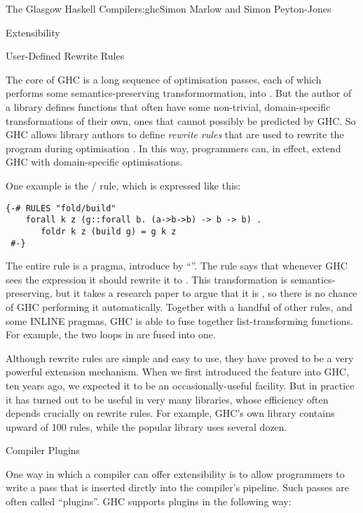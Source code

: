\begin{aosachapter}{The Glasgow Haskell Compiler}{s:ghc}{Simon Marlow and Simon Peyton-Jones}
\begin{aosasect1}{Extensibility}
\begin{aosasect2}{User-Defined Rewrite Rules}
\label{s:rules}

The core of GHC is a long sequence of optimisation passes, each of
which performs some semantics-preserving transformormation,
 into .  But the author of a library defines
functions that often have some non-trivial, domain-specific
transformations of their own, ones that cannot possibly be predicted
by GHC. So GHC allows library authors to define \emph{rewrite rules}
that are used to rewrite the program during optimisation
\cite{bib:playing-by-the-rules}.  In this way, programmers can,
in effect, extend GHC with domain-specific optimisations.

One example is the / rule, which is expressed like this:

\begin{verbatim}
{-# RULES "fold/build"    
    forall k z (g::forall b. (a->b->b) -> b -> b) . 
       foldr k z (build g) = g k z
 #-}
\end{verbatim}

The entire rule is a pragma, introduce by ``''.  The
rule says that whenever GHC sees the expression  it should rewrite it to .  This
transformation is semantics-preserving, but it takes a research paper
to argue that it is \cite{bib:gill-short-cut}, so there is no chance of
GHC performing it automatically.  Together with a handful of other
rules, and some INLINE pragmas, GHC is able to fuse together
list-transforming functions.  For example, the two loops in  are fused into one.

Although rewrite rules are simple and easy to use, they have proved to
be a very powerful extension mechanism.  When we first introduced the
feature into GHC, ten years ago, we expected it to be an
occasionally-useful facility.  But in practice it has turned out to be
useful in very many libraries, whose efficiency often depends
crucially on rewrite rules.  For example, GHC's own 
library contains upward of 100 rules, while the popular 
library uses several dozen.

\end{aosasect2}

\begin{aosasect2}{Compiler Plugins}

One way in which a compiler can offer extensibility is to allow
programmers to write a pass that is inserted dirctly into the
compiler's pipeline.  Such passes are often called ``plugins''.  GHC
supports plugins in the following way:


\end{aosasect2}
\end{aosasect1}
\end{aosachapter}
